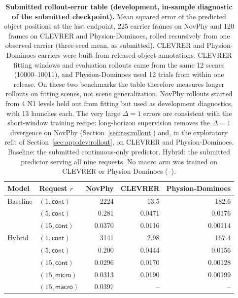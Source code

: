\begin{table}[t]
\centering
\small
\begin{revblock}
\caption{\textbf{Submitted rollout-error table (development, in-sample diagnostic of the submitted checkpoint).} Mean squared error of the predicted object positions at the last endpoint, 225 carrier frames on NovPhy and 120 frames on CLEVRER and Physion-Dominoes, rolled recursively from one observed carrier (three-seed mean, as submitted). CLEVRER and Physion-Dominoes carriers were built from released object annotations. CLEVRER fitting windows and evaluation rollouts came from the same 12 scenes (10000--10011), and Physion-Dominoes used 12 trials from within one release. On these two benchmarks the table therefore measures longer rollouts on fitting scenes, not scene generalization. NovPhy rollouts started from 4 N1 levels held out from fitting but used as development diagnostics, with 13 launches each. The very large $\Delta=1$ errors are consistent with the short-window training recipe: long-horizon supervision removes the $\Delta=1$ divergence on NovPhy (Section~\ref{sec:res:rollout}) and, in the exploratory refit of Section~\ref{sec:app:dev:rollout}, on CLEVRER and Physion-Dominoes. Baseline: the submitted continuous-only predictor. Hybrid: the submitted predictor serving all nine requests. No macro arm was trained on CLEVRER or Physion-Dominoes (--).}
\label{tab:app:dev:rollout}
\end{revblock}
\begin{tabular}{@{}llrrr@{}}
\toprule
Model & Request $r$ & NovPhy & CLEVRER & Physion-Dominoes \\
\midrule
Baseline & $(1,\textsf{cont})$  & 2224   & 13.5   & 182.6 \\
         & $(5,\textsf{cont})$  & 0.281  & 0.0471 & 0.0176 \\
         & $(15,\textsf{cont})$ & 0.0370 & 0.0116 & 0.00114 \\
\midrule
Hybrid   & $(1,\textsf{cont})$  & 3141   & 2.98   & 167.4 \\
         & $(5,\textsf{cont})$  & 0.200  & 0.0444 & 0.0156 \\
         & $(15,\textsf{cont})$ & 0.0296 & 0.0170 & 0.00128 \\
         & $(15,\textsf{micro})$ & 0.0313 & 0.0190 & 0.00199 \\
         & $(15,\textsf{macro})$ & 0.0397 & --     & -- \\
\bottomrule
\end{tabular}
\end{table}

